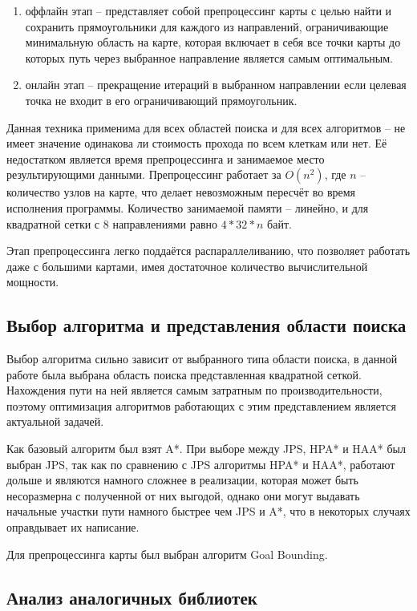 \begin{enumerate}
	\item оффлайн этап -- представляет собой препроцессинг карты с целью найти и сохранить прямоугольники для каждого из направлений, ограничивающие минимальную область на карте, которая включает в себя все точки карты до которых путь через выбранное направление является самым оптимальным.
	\item онлайн этап -- прекращение итераций в выбранном направлении если целевая точка не входит в его ограничивающий прямоугольник.
\end{enumerate}
 
Данная техника применима для всех областей поиска и для всех алгоритмов -- не имеет значение одинакова ли стоимость прохода по всем клеткам или нет. Её недостатком является время препроцессинга и занимаемое место результирующими данными. Препроцессинг работает за $O(n^2)$, где $n$ -- количество узлов на карте, что делает невозможным пересчёт во время исполнения программы. Количество занимаемой памяти -- линейно, и для квадратной сетки с 8 направлениями равно $4 * 32 * n$ байт.

Этап препроцессинга легко поддаётся распараллеливанию, что позволяет работать даже с большими картами, имея достаточное количество вычислительной мощности. 

\subsection{Выбор алгоритма и представления области поиска}

Выбор алгоритма сильно зависит от выбранного типа области поиска, в данной работе была выбрана область поиска представленная квадратной сеткой. Нахождения пути на ней является самым затратным по производительности, поэтому оптимизация алгоритмов работающих с этим представлением является актуальной задачей. 

Как базовый алгоритм был взят A*. При выборе между JPS, HPA* и HAA* был выбран JPS, так как по сравнению с JPS алгоритмы HPA* и HAA*, работают дольше и являются намного сложнее в реализации, которая может быть несоразмерна с полученной от них выгодой, однако они могут выдавать начальные участки пути намного быстрее чем JPS и A*, что в некоторых случаях оправдывает их написание.  

Для препроцессинга карты был выбран алгоритм Goal Bounding.

\subsection{Анализ аналогичных библиотек}

